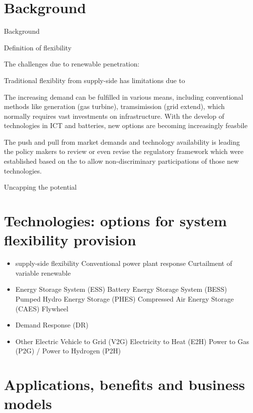 \documentclass[a4paper,11pt,twoside,onecolumn]{book}
\begin{document}
\section{Background}

Background

Definition of flexibility

The challenges due to renewable penetration:

Traditional flexiblity from supply-side has limitations due to %

The increasing demand can be fulfilled in various means, including conventional methods like generation (gas turbine), tramsimission (grid extend), which normally requires vast investments on infrastructure. With the develop of technologies in ICT and batteries, new options are becoming increasingly feasbile %

The push and pull from market demands and technology availability is leading the policy makers to review or even revise the regulatory framework which were established based on the  to allow non-discriminary participations of those new technologies. %

Uncapping the potential

\section{Technologies: options for system flexibility provision}

\begin{itemize}
	\item supply-side flexibility
	\subitem Conventional power plant response
	\subitem Curtailment of variable renewable
	\item Energy Storage System (ESS)
	\subitem Battery Energy Storage System (BESS)
	\subitem Pumped Hydro Energy Storage (PHES)
	\subitem Compressed Air Energy Storage (CAES)
	\subitem Flywheel
	\item Demand Response (DR)
	\item Other
	\subitem Electric Vehicle to Grid (V2G)
	\subitem Electricity to Heat (E2H)
	\subitem Power to Gas (P2G) / Power to Hydrogen (P2H)
\end{itemize}

\section{Applications, benefits and business models}
\end{document}
